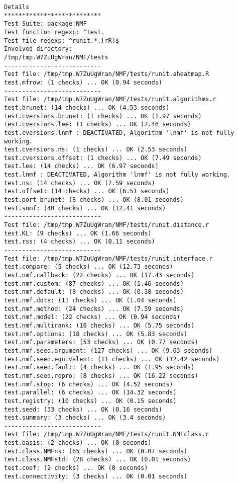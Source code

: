 \documentclass[10pt]{article}
\begin{document}
\begin{verbatim}
Details 
*************************** 
Test Suite: package:NMF 
Test function regexp: ^test. 
Test file regexp: ^runit.*.[rR]$ 
Involved directory: 
/tmp/tmp.W7ZuUgWran/NMF/tests 
--------------------------- 
Test file: /tmp/tmp.W7ZuUgWran/NMF/tests/runit.aheatmap.R 
test.mfrow: (1 checks) ... OK (0.94 seconds)
--------------------------- 
Test file: /tmp/tmp.W7ZuUgWran/NMF/tests/runit.algorithms.r 
test.brunet: (14 checks) ... OK (4.53 seconds)
test.cversions.brunet: (1 checks) ... OK (1.97 seconds)
test.cversions.lee: (1 checks) ... OK (2.46 seconds)
test.cversions.lnmf : DEACTIVATED, Algorithm 'lnmf' is not fully working.
test.cversions.ns: (1 checks) ... OK (2.53 seconds)
test.cversions.offset: (1 checks) ... OK (7.49 seconds)
test.lee: (14 checks) ... OK (6.97 seconds)
test.lnmf : DEACTIVATED, Algorithm 'lnmf' is not fully working.
test.ns: (14 checks) ... OK (7.59 seconds)
test.offset: (14 checks) ... OK (6.51 seconds)
test.port_brunet: (8 checks) ... OK (8.01 seconds)
test.snmf: (40 checks) ... OK (12.41 seconds)
--------------------------- 
Test file: /tmp/tmp.W7ZuUgWran/NMF/tests/runit.distance.r 
test.KL: (9 checks) ... OK (1.66 seconds)
test.rss: (4 checks) ... OK (0.11 seconds)
--------------------------- 
Test file: /tmp/tmp.W7ZuUgWran/NMF/tests/runit.interface.r 
test.compare: (5 checks) ... OK (12.73 seconds)
test.nmf.callback: (22 checks) ... OK (17.43 seconds)
test.nmf.custom: (87 checks) ... OK (1.46 seconds)
test.nmf.default: (8 checks) ... OK (0.38 seconds)
test.nmf.dots: (11 checks) ... OK (1.04 seconds)
test.nmf.method: (24 checks) ... OK (7.59 seconds)
test.nmf.model: (22 checks) ... OK (0.94 seconds)
test.nmf.multirank: (10 checks) ... OK (5.75 seconds)
test.nmf.options: (18 checks) ... OK (5.83 seconds)
test.nmf.parameters: (53 checks) ... OK (0.77 seconds)
test.nmf.seed.argument: (127 checks) ... OK (9.63 seconds)
test.nmf.seed.equivalent: (11 checks) ... OK (12.42 seconds)
test.nmf.seed.fault: (4 checks) ... OK (1.95 seconds)
test.nmf.seed.repro: (8 checks) ... OK (16.22 seconds)
test.nmf.stop: (6 checks) ... OK (4.52 seconds)
test.parallel: (6 checks) ... OK (14.32 seconds)
test.registry: (10 checks) ... OK (0.15 seconds)
test.seed: (33 checks) ... OK (0.16 seconds)
test.summary: (3 checks) ... OK (3.4 seconds)
--------------------------- 
Test file: /tmp/tmp.W7ZuUgWran/NMF/tests/runit.NMFclass.r 
test.basis: (2 checks) ... OK (0 seconds)
test.class.NMFns: (65 checks) ... OK (0.07 seconds)
test.class.NMFstd: (28 checks) ... OK (0.01 seconds)
test.coef: (2 checks) ... OK (0 seconds)
test.connectivity: (3 checks) ... OK (0.01 seconds)

\end{verbatim}
\end{document}
